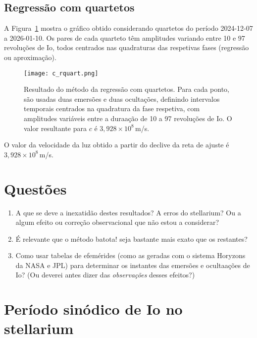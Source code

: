 \documentclass[]{article}
\begin{document}
\subsection{Regressão com quartetos}
A Figura~\ref{fig:bb} mostra o gráfico obtido considerando quartetos do período
2024-12-07 a 2026-01-10. Os pares de cada quarteto têm amplitudes variando entre
10 e 97 revoluções de Io, todos centrados nas quadraturas das respetivas fases
(regressão ou aproximação).
\begin{figure}[htb]
  \begin{center}
    \texttt{[image: c\_rquart.png]}
  \end{center}
  \caption{\label{fig:bb}Resultado do método da regressão com quartetos. Para
  cada ponto, são usadas duas emersões e duas ocultações, definindo intervalos
  temporais centrados na quadratura da fase respetiva, com amplitudes variáveis
  entre a duraação de 10 a 97 revoluções de Io. O valor resultante para $c$ é
$3,928\times10^8$\,m/s.}
\end{figure}
O valor da velocidade da luz obtido a partir do declive da reta de ajuste é
$3,928\times10^8\,$m/s.

\section{Questões}
\begin{enumerate}
  \item A que se deve a inexatidão destes resultados? A erros do stellarium? Ou
    a algum efeito ou correção observacional que não estou a considerar?
  \item É relevante que o método batota! seja bastante mais exato que os
    restantes?
  \item Como usar tabelas de efemérides (como as geradas com o sistema Horyzons
    da NASA e JPL) para determinar os instantes das emersões e ocultaações de
    Io?  (Ou deverei antes dizer das \emph{observações} desses efeitos?)
\end{enumerate}

\section{Período sinódico de Io no stellarium}
\end{document}
